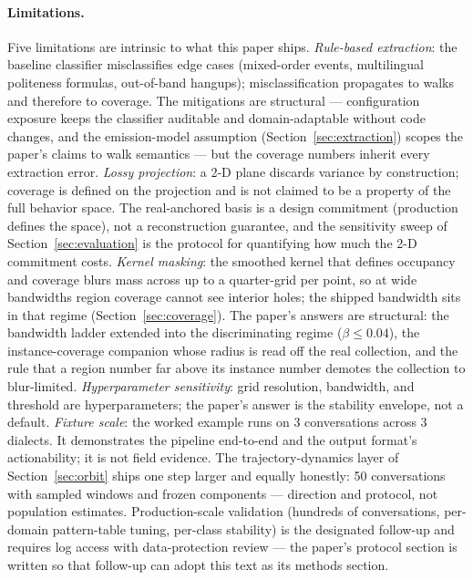 \paragraph{Limitations.}
Five limitations are intrinsic to what this paper ships.
\emph{Rule-based extraction}: the baseline classifier misclassifies edge cases (mixed-order
events, multilingual politeness formulas, out-of-band hangups); misclassification propagates
to walks and therefore to coverage.
The mitigations are structural --- configuration exposure keeps the classifier auditable and
domain-adaptable without code changes, and the emission-model assumption
(Section~\ref{sec:extraction}) scopes the paper's claims to walk semantics --- but the
coverage numbers inherit every extraction error.
\emph{Lossy projection}: a 2-D plane discards variance by construction; coverage is defined
on the projection and is not claimed to be a property of the full behavior space.
The real-anchored basis is a design commitment (production defines the space), not a
reconstruction guarantee, and the sensitivity sweep of Section~\ref{sec:evaluation} is the
protocol for quantifying how much the 2-D commitment costs.
\emph{Kernel masking}: the smoothed kernel that defines occupancy and coverage blurs mass
across up to a quarter-grid per point, so at wide bandwidths region coverage cannot see
interior holes; the shipped bandwidth sits in that regime (Section~\ref{sec:coverage}).
The paper's answers are structural: the bandwidth ladder extended into the discriminating
regime ($\beta \le 0.04$), the instance-coverage companion whose radius is read off the real
collection, and the rule that a region number far above its instance number demotes the
collection to blur-limited.
\emph{Hyperparameter sensitivity}: grid resolution, bandwidth, and threshold are
hyperparameters; the paper's answer is the stability envelope, not a default.
\emph{Fixture scale}: the worked example runs on 3 conversations across 3 dialects.
It demonstrates the pipeline end-to-end and the output format's actionability; it is not
field evidence.
The trajectory-dynamics layer of Section~\ref{sec:orbit} ships one step larger and equally
honestly: 50 conversations with sampled windows and frozen components --- direction and
protocol, not population estimates.
Production-scale validation (hundreds of conversations, per-domain pattern-table tuning,
per-class stability) is the designated follow-up and requires log access with
data-protection review --- the paper's protocol section is written so that follow-up can
adopt this text as its methods section.

